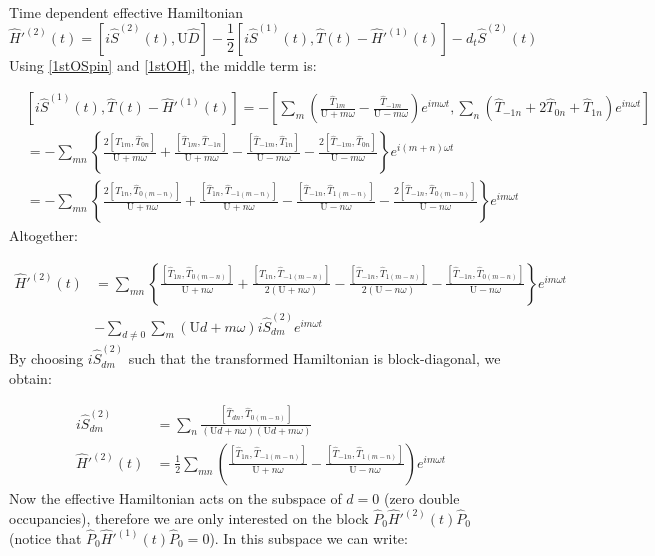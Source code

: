 \begin{section}{Time dependent effective Hamiltonian}
\begin{equation}
\hat{H}'^{(2)}(t) = \left[i\hat{S}^{(2)}(t), \text{U} \hat{D} \right] - \frac{1}{2}\left[ i\hat{S}^{(1)}(t), \hat{T}(t) - \hat{H}'^{(1)}(t)\right] - d_t\hat{S}^{(2)}(t)
\end{equation}
Using \ref{1stOSpin} and \ref{1stOH}, the middle term is:

\begin{align*}
&\left[ i\hat{S}^{(1)}(t), \hat{T}(t) - \hat{H}'^{(1)}(t)\right] = -\left[\sum_m \left( \frac{\hat{T}_{1m}}{\text{U}+m\omega} - \frac{\hat{T}_{-1m}}{\text{U}-m\omega} \right)e^{im \omega t}, \sum_n \left( \hat{T}_{-1n} + 2\hat{T}_{0n} + \hat{T}_{1n} \right) e^{in\omega t} \right] \\
&= -\sum_{mn} \left\{ \frac{2\left[\hat{T}_{1m}, \hat{T}_{0n} \right]}{\text{U}+m\omega} + \frac{\left[\hat{T}_{1m}, \hat{T}_{-1n} \right]}{\text{U}+m\omega} - \frac{\left[\hat{T}_{-1m}, \hat{T}_{1n} \right]}{\text{U}-m\omega} - \frac{2\left[\hat{T}_{-1m}, \hat{T}_{0n} \right]}{\text{U}-m\omega} \right\} e^{i(m+n)\omega t} \\
&= -\sum_{mn} \left\{ \frac{2\left[\hat{T}_{1n}, \hat{T}_{0(m-n)} \right]}{\text{U}+n\omega} + \frac{\left[\hat{T}_{1n}, \hat{T}_{-1(m-n)} \right]}{\text{U}+n\omega} - \frac{\left[\hat{T}_{-1n}, \hat{T}_{1(m-n)} \right]}{\text{U}-n\omega} - \frac{2\left[\hat{T}_{-1n}, \hat{T}_{0(m-n)} \right]}{\text{U}-n\omega} \right\} e^{im\omega t}
\end{align*}
Altogether:

\begin{align*}
\hat{H}'^{(2)}(t) &= \sum_{mn} \left\{ \frac{\left[\hat{T}_{1n}, \hat{T}_{0(m-n)} \right]}{\text{U}+n\omega} + \frac{\left[\hat{T}_{1n}, \hat{T}_{-1(m-n)} \right]}{2(\text{U}+n\omega)} - \frac{\left[\hat{T}_{-1n}, \hat{T}_{1(m-n)} \right]}{2(\text{U}-n\omega)} - \frac{\left[\hat{T}_{-1n}, \hat{T}_{0(m-n)} \right]}{\text{U}-n\omega} \right\} e^{im\omega t} \\
&-\sum_{d\neq 0}\sum_m (\text{U}d+m\omega) i\hat{S}^{(2)}_{dm} e^{im\omega t}
\end{align*}
By choosing $i\hat{S}^{(2)}_{dm}$ such that the transformed Hamiltonian is block-diagonal, we obtain:

\begin{align}
i\hat{S}^{(2)}_{dm} &= \sum_n \frac{\left[ \hat{T}_{dn}, \hat{T}_{0(m-n)} \right]}{(\text{U}d+n\omega)(\text{U}d+m\omega)} \label{2ndOSpin}\\
\hat{H}'^{(2)}(t) &= \frac{1}{2}\sum_{mn} \left( \frac{\left[\hat{T}_{1n}, \hat{T}_{-1(m-n)} \right]}{\text{U}+n\omega} - \frac{\left[\hat{T}_{-1n}, \hat{T}_{1(m-n)} \right]}{\text{U}-n\omega} \right) e^{im\omega t} \label{2ndOH}
\end{align}
Now the effective Hamiltonian acts on the subspace of $d=0$ (zero double occupancies), therefore we are only interested on the block $\hat{P}_0 \hat{H}'^{(2)}(t) \hat{P}_0$ (notice that $\hat{P}_0 \hat{H}'^{(1)}(t) \hat{P}_0 = 0$). In this subspace we can write:


\end{section}
